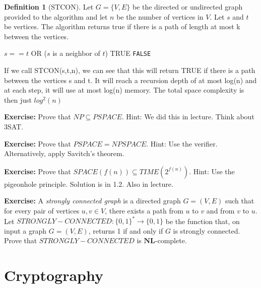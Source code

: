 \documentclass[10pt]{article}
\theoremstyle{definition}
\newtheorem{defn}[theorem]{Definition}
\begin{document}
\begin{defn}[\textsc{STCON}]
  Let $G = \{V,E\}$ be the
  directed or undirected graph provided to the algorithm and let $n$ be the
  number of vertices in $V$. Let $s$ and $t$ be vertices. The algorithm returns true if there is a path of length at most k between the vertices.

  \begin{algorithmic}
    \State \Return $s == t$ OR ($s$ is a neighbor of $t$)
    \EndIf
    \State \Return TRUE
    \Else
    \EndIf
    \EndFor
    \EndIf
    \State \Return \texttt{FALSE}
  \end{algorithmic}

  If we call STCON(s,t,n), we can see that this will return TRUE if there is a path between the vertices s and t. It will reach a recursion depth of at most log(n) and at each step, it will use at most log(n) memory. The total space complexity is then just $log^2(n)$
\end{defn}


\textbf{Exercise:} Prove that $NP \subseteq PSPACE$. Hint: We did this in lecture. Think about 3SAT.

\textbf{Exercise:} Prove that $PSPACE = NPSPACE$. Hint: Use the verifier. Alternatively, apply Savitch's theorem.

\textbf{Exercise:} Prove that $SPACE(f(n)) \subseteq TIME(2^{f(n)})$. Hint: Use the pigeonhole principle. Solution is in 1.2. Also in lecture.

\textbf{Exercise:} A \textit{strongly connected graph} is a directed graph $G = (V,E)$ such that for every pair of vertices $u, v \in V$, there exists a path from $u$ to $v$ and from $v$ to $u$.  Let $STRONGLY-CONNECTED : \{0,1\}^* \rightarrow \{0,1\}$ be the function that, on input a graph $G = (V,E)$, returns 1 if and only if $G$ is strongly connected.  Prove that $STRONGLY-CONNECTED$ is $\mathbf{NL}$-complete. 










\section{Cryptography}
\end{document}
